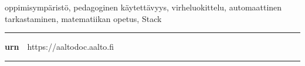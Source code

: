 \begin{spacing}{.88}
{\parindent0pt %

\parbox[t]{121.6mm}{\raggedright\small oppimisympäristö, pedagoginen käytettävyys, virheluokittelu, automaattinen tarkastaminen, matematiikan opetus, Stack}

\vspace{.5mm}\rule{\textwidth}{.75pt}

{\fontsize{10.5pt}{10.5pt}\bfseries\sffamily\lsstyle urn}~~{\small https://aaltodoc.aalto.fi}

\vspace{-2.4mm}\rule{\textwidth}{.75pt}

} %
\end{spacing}




\newpage
{}
{}


